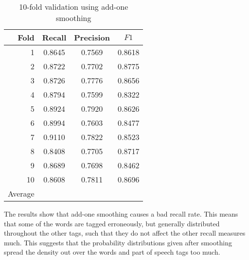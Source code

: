 \documentclass[12pt]{homework}
\begin{document}
\begin{table}
	\begin{center}
	\begin{tabular}{r | c c c}
	\hline
	Fold	&	Recall	&	Precision& $F1$ \\
	\hline
	1	 &	0.8645	&	0.7569	&	0.8618\\
	2	 &	0.8722	&	0.7702	&	0.8775\\
	3	 &	0.8726	&	0.7776	&	0.8656\\
	4	 &	0.8794	&	0.7599	&	0.8322\\
	5	 &	0.8924	&	0.7920	&	0.8626\\
	6	 &	0.8994	&	0.7603	&	0.8477\\
	7	 &	0.9110	&	0.7822	&	0.8523\\
	8	 &	0.8408	&	0.7705	&	0.8717\\
	9	 &	0.8689	&	0.7698	&	0.8462\\
	10	 &	0.8608	&	0.7811	&	0.8696\\
	\hline
	Average &		&		&			\\
	\hline
	\end{tabular}
	\end{center}
	\caption{10-fold validation using add-one smoothing}
	\label{addoneresult}
\end{table}
The results show that add-one smoothing causes a bad recall rate. This means 
that some of the words are tagged erroneously, but generally distributed 
throughout the other tags, such that they do not affect the other recall 
measures much. This suggests that the probability distributions given after 
smoothing spread the density out over the words and part of speech tags too 
much.
\end{document}
